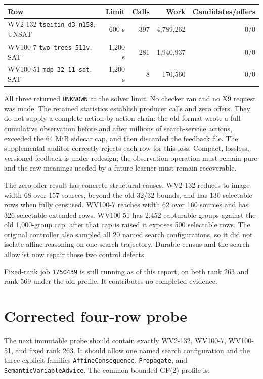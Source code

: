 \documentclass[11pt]{article}
\newcommand{\code}[1]{\texttt{#1}}
\begin{document}
\begin{center}
\small
\begin{tabularx}{\textwidth}{@{}Xr r r r@{}}
\toprule
Row & Limit & Calls & Work & Candidates/offers \\
\midrule
WV2-132 \code{tseitin\_d3\_n158}, UNSAT & 600 s & 397 & 4,789,262 & 0/0 \\
WV100-7 \code{two-trees-511v}, SAT & 1,200 s & 281 & 1,940,937 & 0/0 \\
WV100-51 \code{mdp-32-11-sat}, SAT & 1,200 s & 8 & 170,560 & 0/0 \\
\bottomrule
\end{tabularx}
\end{center}

All three returned \code{UNKNOWN} at the solver limit.  No checker ran and no
X9 request was made.  The retained statistics establish producer calls and
zero offers.  They do not supply a complete action-by-action chain: the old
format wrote a full cumulative observation before and after millions of
search-service actions, exceeded the 64 MiB sidecar cap, and then discarded the
feedback file.  The supplemental auditor correctly rejects each row for this
loss.  Compact, lossless, versioned feedback is under redesign; the observation
operation must remain pure and the raw meanings needed by a future learner must
remain recoverable.

The zero-offer result has concrete structural causes.  WV2-132 reduces to image
width 68 over 157 sources, beyond the old 32/32 bounds, and has 130 selectable
rows when fully censused.  WV100-7 reaches width 62 over 160 sources and has 326
selectable extended rows.  WV100-51 has 2,452 capturable groups against the old
1,000-group cap; after that cap is raised it exposes 500 selectable rows.  The
original controller also sampled all 20 named search configurations, so it did
not isolate affine reasoning on one search trajectory.  Durable census and the
search allowlist now repair those two control defects.

Fixed-rank job \code{1750439} is still running as of this report, on both rank
263 and rank 569 under the old profile.  It contributes no completed evidence.

\section*{Corrected four-row probe}

The next immutable probe should contain exactly WV2-132, WV100-7, WV100-51,
and fixed rank 263.  It should allow one named search configuration and the
three explicit families \code{AffineConsequence}, \code{Propagate}, and
\code{SemanticVariableAdvice}.  The common bounded GF(2) profile is:
\end{document}
